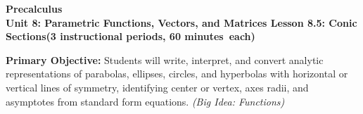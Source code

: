 \documentclass[10pt]{article}
\newcommand{\CourseName}{Precalculus}
\newcommand{\MeetingLength}{60 minutes}
\newcommand{\UnitNumberName}{Unit 8: Parametric Functions, Vectors, and Matrices \quad}
\newcommand{\LessonNumberName}{Lesson 8.5: Conic Sections}
\begin{document}
\begin{center}
  {\Large\bfseries \CourseName} \\[4pt]
  {\small\bfseries \UnitNumberName \LessonNumberName \quad (3 instructional periods, \MeetingLength\ each)}
\end{center}

\begin{tcolorbox}[colback=sky, colframe=navy, boxrule=0.9pt, arc=2mm,
    left=2mm, right=2mm, top=1.5mm, bottom=1.5mm]
  \textbf{Primary Objective:} Students will write, interpret, and convert
  analytic representations of parabolas, ellipses, circles, and hyperbolas
  with horizontal or vertical lines of symmetry, identifying center or vertex,
  axes radii, and asymptotes from standard form equations.
  \textit{(Big Idea: Functions)}
\end{tcolorbox}

\vspace{0.08in}
\end{document}
